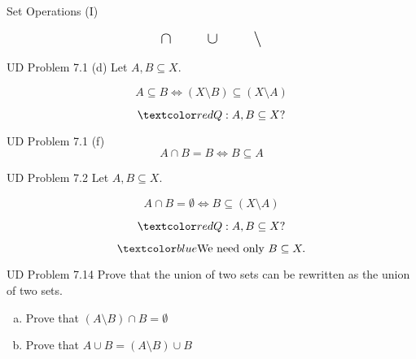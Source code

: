 
\begin{frame}{}
  \begin{center}
    {\Large Set Operations (I)}
  \end{center}

  \[
    \text{\Large $\cap \qquad \cup \qquad \setminus$}
  \]
\end{frame}

\begin{frame}
  \begin{exampleblock}{UD Problem 7.1 (d)}
    Let $A, B \subseteq X$.

    \[
      A \subseteq B \iff (X \setminus B) \subseteq (X \setminus A)
    \]
  \end{exampleblock}

  \pause
  \[
    \red{Q: A, B \subseteq X?}
  \]

  \pause
  \begin{exampleblock}{UD Problem 7.1 (f)}
    \[
      A \cap B = B \iff B \subseteq A
    \]
  \end{exampleblock}
\end{frame}

\begin{frame}
  \begin{exampleblock}{UD Problem 7.2}
    Let $A, B \subseteq X$.

    \[
      A \cap B = \emptyset \iff B \subseteq (X \setminus A)
    \]
  \end{exampleblock}

  \pause
  \[
    \red{Q: A, B \subseteq X?}
  \]

  \pause
  \[
    \blue{\text{We need only } B \subseteq X.}
  \]
\end{frame}

\begin{frame}{}
  \begin{exampleblock}{UD Problem 7.14}
    Prove that the union of two sets can be rewritten as the union of two  sets.
    \begin{enumerate}[(a)]
      \item Prove that $(A \setminus B) \cap B = \emptyset$
      \item Prove that $A \cup B = (A \setminus B) \cup B$
    \end{enumerate}
  \end{exampleblock}

  \vspace{0.30cm}
  \begin{columns}
      \pause
  \end{columns}
\end{frame}

